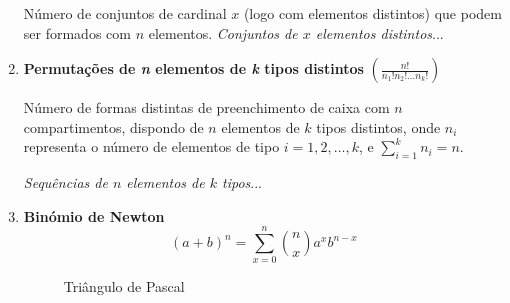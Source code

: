 \begin{enumerate}[label=$\bullet$]
    \noindent Número de conjuntos de cardinal $x$ (logo com elementos distintos) que podem ser formados com $n$ elementos. \hfill {\small \textit{Conjuntos de $x$ elementos distintos}...}
    
    \item \textbf{Permutações de \textit{n} elementos de \textit{k} tipos distintos} \hfill $\left(\frac{n!}{n_1!n_2!\dots n_k!}\right)$

    \noindent Número de formas distintas de preenchimento de caixa com $n$ compartimentos, dispondo de $n$ elementos de $k$ tipos distintos, onde $n_i$ representa o número de elementos de tipo $i=1,2,\dots,k$, e $\sum_{i=1}^{k} n_i = n$. 
    
    \vspace{-0.425em}
    \hfill {\small \textit{Sequências de $n$ elementos de $k$ tipos}...} 
    
    \item \textbf{Binómio de Newton}
    $$
        (a+b)^n = \sum_{x=0}^{n} \binom{n}{x} a^x b^{n-x}
    $$

    \begin{figure}[H]
    \centering
        \caption{Triângulo de Pascal}
    \end{figure}
\end{enumerate}


